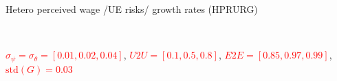 \documentclass{beamer}
\begin{document}
\begin{frame}{Hetero perceived wage /UE risks/ growth rates (HPRURG)}
	\label{StE_dist_compare_HPRURG}
	
	\begin{figure}[!ht]
		\begin{center}
			 \\
		\end{center}
	\end{figure}
	{\scriptsize\textcolor{red}{$\sigma_\psi = \sigma_\theta = [0.01,0.02,0.04]$}, \textcolor{red}{$U2U=[0.1,0.5,0.8]$}, \textcolor{red}{$E2E = [0.85, 0.97, 0.99]$}, \textcolor{red}{$\text{std}(G) = 0.03$}} 
\end{frame}


		

\end{document}
